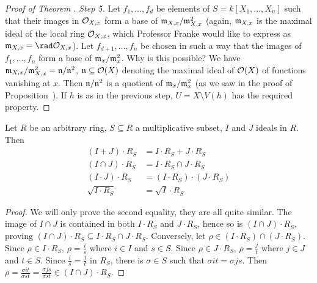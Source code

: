 \documentclass[a4paper,parskip=half,numbers=enddot, DIV=12]{scrreprt}
\begin{document}
\begin{proof}[Proof of Theorem ]
    \emph{Step 5.} Let $f_1,\ldots, f_d$ be elements of $S= k[X_1,\ldots, X_n]$ such that their images in $\mathcal{O}_{X,x}$ form a base of $\mathfrak{m}_{X,x}/\mathfrak{m}_{X,x}^2$ (again, $\mathfrak{m}_{X,x}$ is the maximal ideal of the local ring $\mathcal{O}_{X,x}$, which Professor Franke would like to express as $\mm_{X,x}=\rad \Oo_{X,x}$). Let $f_{d+1},\ldots, f_n$ be chosen in such a way that the images of $f_1,\ldots, f_n$ form a base of $\mathfrak{m}_x/\mathfrak{m}_x^2$. Why is this possible? We have $\mathfrak{m}_{X,x}/\mathfrak{m}_{X,x}^2=\mathfrak{n}/\mathfrak{n}^2$, $\mathfrak{n}\subseteq\mathcal{O}(X)$ denoting the maximal ideal of $\mathcal{O}(X)$ of functions vanishing at $x$. Then $\mathfrak{n}/\mathfrak{n}^2$ is a quotient of $\mathfrak{m}_x/\mathfrak{m}_x^2$ (as we saw in the proof of Proposition~). If $h$ is as in the previous step, $U= X\setminus V(h)$ has the required property.
\end{proof}
\begin{rem}
    Let $R$ be an arbitrary ring, $S\subseteq R$ a multiplicative subset, $I$ and $J$ ideals in $R$. Then 
    \begin{align*}
        (I+J) \cdot R_S &= I\cdot R_S + J \cdot R_S\\
        (I\cap J)\cdot R_S &= I\cdot R_S \cap J\cdot R_S\\
        (I\cdot J)\cdot R_S &= (I\cdot R_S)\cdot(J\cdot R_S)\\
        \sqrt{I\cdot R_S}&= \sqrt{I}\cdot R_S
    \end{align*}
\end{rem}
\begin{proof}
    We will only prove the second equality, they are all quite similar. The image of $I\cap J$ is contained in both $I\cdot R_S$ and $J\cdot R_S$, hence so is $(I\cap J)\cdot R_S$, proving $(I\cap J) \cdot R_S \subseteq I\cdot R_S \cap J\cdot R_S$. Conversely, let $\rho \in (I \cdot R_S)\cap (J\cdot R_S)$. Since $\rho\in I\cdot R_S$, $\rho = \frac{i}{s}$ where $i\in I$ and $s\in S$. Since $\rho\in J\cdot R_S$, $\rho = \frac{j}{t}$ where $j\in J$ and $t\in S$. Since $\frac{i}{s}=\frac{j}{t}$ in $R_S$, there is $\sigma \in S$ such that $\sigma i t = \sigma  j  s$. Then $\rho = \frac{\sigma  i t}{\sigma  s t} = \frac{\sigma  j s}{\sigma  s t}\in (I\cap J)\cdot R_S$.
\end{proof}
\end{document}

